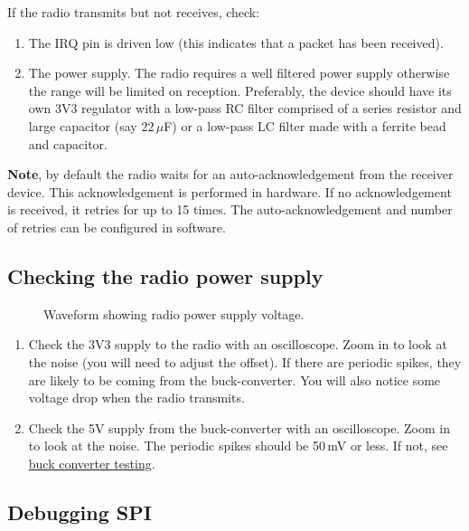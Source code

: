 If the radio transmits but not receives, check:

\begin{enumerate}
\item
  The IRQ pin is driven low (this indicates that a packet has been
  received).
\item
  The power supply. The radio requires a well filtered power supply
  otherwise the range will be limited on reception. Preferably, the
  device should have its own 3V3 regulator with a low-pass RC filter
  comprised of a series resistor and large capacitor (say 22\,$\mu$F)
  or a low-pass LC filter made with a ferrite bead and capacitor.
\end{enumerate}

\textbf{Note}, by default the radio waits for an auto-acknowledgement
from the receiver device. This acknowledgement is performed in hardware.
If no acknowledgement is received, it retries for up to 15 times. The
auto-acknowledgement and number of retries can be configured in
software.

\subsection{Checking the radio power supply}
\label{checking-the-radio-power-supply}

\begin{figure}[!h]
  \centering
  \caption{Waveform showing radio power supply voltage.}
\end{figure}

\begin{enumerate}
\item Check the 3V3 supply to the radio with an oscilloscope. Zoom in
  to look at the noise (you will need to adjust the offset).  If there
  are periodic spikes, they are likely to be coming from the
  buck-converter.  You will also notice some voltage drop when the
  radio transmits.

\item Check the 5V supply from the buck-converter with an
  oscilloscope.  Zoom in to look at the noise.  The periodic spikes
  should be 50\,mV or less.  If not, see
  \hyperref[buck-converter-testing]{buck converter testing}.
\end{enumerate}


\subsection{Debugging SPI}
\label{debugging-spi}


